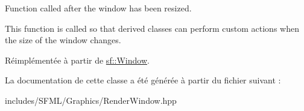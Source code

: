 Function called after the window has been resized. 

This function is called so that derived classes can perform custom actions when the size of the window changes. 

Réimplémentée à partir de \hyperlink{classsf_1_1Window_a10f567a387da7b49f417f73321fcf64d}{sf\+::\+Window}.



La documentation de cette classe a été générée à partir du fichier suivant \+:\begin{DoxyCompactItemize}
\item 
includes/\+S\+F\+M\+L/\+Graphics/Render\+Window.\+hpp\end{DoxyCompactItemize}
